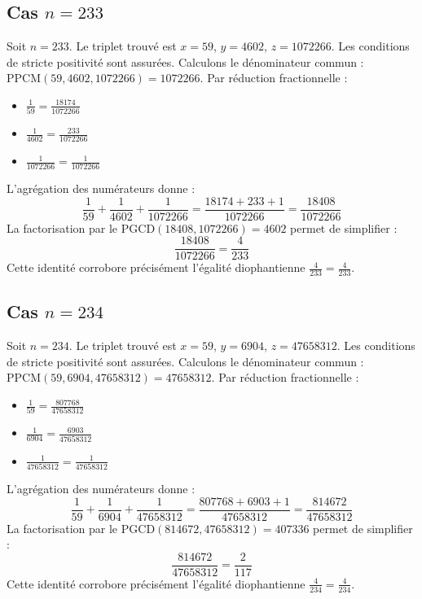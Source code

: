 \documentclass[11pt,a4paper]{article}
\begin{document}
\subsection{Cas $n = 233$}
Soit $n = 233$. Le triplet trouvé est $x = 59$, $y = 4602$, $z = 1072266$.
Les conditions de stricte positivité sont assurées.
Calculons le dénominateur commun : $\text{PPCM}(59, 4602, 1072266) = 1072266$.
Par réduction fractionnelle :
\begin{itemize}
    \item $\frac{1}{59} = \frac{18174}{1072266}$
    \item $\frac{1}{4602} = \frac{233}{1072266}$
    \item $\frac{1}{1072266} = \frac{1}{1072266}$
\end{itemize}
L'agrégation des numérateurs donne :
$$ \frac{1}{59} + \frac{1}{4602} + \frac{1}{1072266} = \frac{18174 + 233 + 1}{1072266} = \frac{18408}{1072266} $$
La factorisation par le $\text{PGCD}(18408, 1072266) = 4602$ permet de simplifier :
$$ \frac{18408}{1072266} = \frac{4}{233} $$
Cette identité corrobore précisément l'égalité diophantienne $\frac{4}{233} = \frac{4}{233}$.

\subsection{Cas $n = 234$}
Soit $n = 234$. Le triplet trouvé est $x = 59$, $y = 6904$, $z = 47658312$.
Les conditions de stricte positivité sont assurées.
Calculons le dénominateur commun : $\text{PPCM}(59, 6904, 47658312) = 47658312$.
Par réduction fractionnelle :
\begin{itemize}
    \item $\frac{1}{59} = \frac{807768}{47658312}$
    \item $\frac{1}{6904} = \frac{6903}{47658312}$
    \item $\frac{1}{47658312} = \frac{1}{47658312}$
\end{itemize}
L'agrégation des numérateurs donne :
$$ \frac{1}{59} + \frac{1}{6904} + \frac{1}{47658312} = \frac{807768 + 6903 + 1}{47658312} = \frac{814672}{47658312} $$
La factorisation par le $\text{PGCD}(814672, 47658312) = 407336$ permet de simplifier :
$$ \frac{814672}{47658312} = \frac{2}{117} $$
Cette identité corrobore précisément l'égalité diophantienne $\frac{4}{234} = \frac{4}{234}$.
\end{document}
